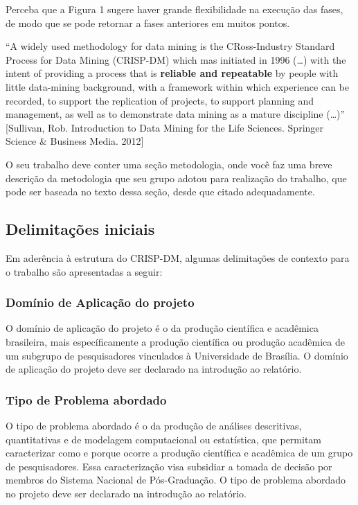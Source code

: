 \documentclass[]{article}
\begin{document}
Perceba que a Figura 1 sugere haver grande flexibilidade na execução das
fases, de modo que se pode retornar a fases anteriores em muitos pontos.

``A widely used methodology for data mining is the CRoss-Industry
Standard Process for Data Mining (CRISP-DM) which mas initiated in 1996
(\ldots{}) with the intent of providing a process that is
\textbf{reliable and repeatable} by people with little data-mining
background, with a framework within which experience can be recorded, to
support the replication of projects, to support planning and management,
as well as to demonstrate data mining as a mature discipline
(\ldots{})'' {[}Sullivan, Rob. Introduction to Data Mining for the Life
Sciences. Springer Science \& Business Media. 2012{]}

O seu trabalho deve conter uma seção metodologia, onde você faz uma
breve descrição da metodologia que seu grupo adotou para realização do
trabalho, que pode ser baseada no texto dessa seção, desde que citado
adequadamente.

\subsection{Delimitações iniciais}\label{delimitacoes-iniciais}

Em aderência à estrutura do CRISP-DM, algumas delimitações de contexto
para o trabalho são apresentadas a seguir:

\subsubsection{Domínio de Aplicação do
projeto}\label{dominio-de-aplicacao-do-projeto}

O domínio de aplicação do projeto é o da produção científica e acadêmica
brasileira, mais específicamente a produção científica ou produção
acadêmica de um subgrupo de pesquisadores vinculados à Universidade de
Brasília. O domínio de aplicação do projeto deve ser declarado na
introdução ao relatório.

\subsubsection{Tipo de Problema
abordado}\label{tipo-de-problema-abordado}

O tipo de problema abordado é o da produção de análises descritivas,
quantitativas e de modelagem computacional ou estatística, que permitam
caracterizar como e porque ocorre a produção científica e acadêmica de
um grupo de pesquisadores. Essa caracterização visa subsidiar a tomada
de decisão por membros do Sistema Nacional de Pós-Graduação. O tipo de
problema abordado no projeto deve ser declarado na introdução ao
relatório.
\end{document}
